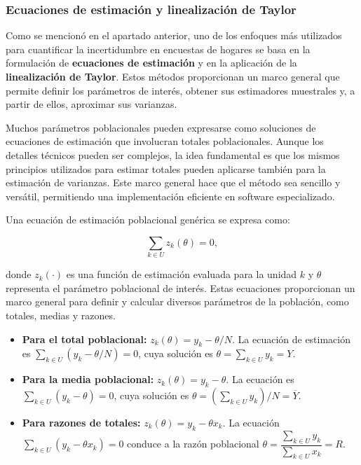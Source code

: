 \documentclass[
  12pt,
]{book}
\begin{document}
\subsubsection*{Ecuaciones de estimación y linealización de Taylor}\label{ecuaciones-de-estimaciuxf3n-y-linealizaciuxf3n-de-taylor}

Como se mencionó en el apartado anterior, uno de los enfoques más utilizados para cuantificar la incertidumbre en encuestas de hogares se basa en la formulación de \textbf{ecuaciones de estimación} y en la aplicación de la \textbf{linealización de Taylor}. Estos métodos proporcionan un marco general que permite definir los parámetros de interés, obtener sus estimadores muestrales y, a partir de ellos, aproximar sus varianzas.

Muchos parámetros poblacionales pueden expresarse como soluciones de ecuaciones de estimación que involucran totales poblacionales. Aunque los detalles técnicos pueden ser complejos, la idea fundamental es que los mismos principios utilizados para estimar totales pueden aplicarse también para la estimación de varianzas. Este marco general hace que el método sea sencillo y versátil, permitiendo una implementación eficiente en software especializado.

Una ecuación de estimación poblacional genérica se expresa como:

\[
\sum_{k\in U} z_k(\theta)=0,
\]

donde \(z_k(\cdot)\) es una función de estimación evaluada para la unidad \(k\) y \(\theta\) representa el parámetro poblacional de interés. Estas ecuaciones proporcionan un marco general para definir y calcular diversos parámetros de la población, como totales, medias y razones.

\begin{itemize}
\item
  \textbf{Para el total poblacional:}
  \(z_k(\theta)=y_k-\theta/N\). La ecuación de estimación es \(\sum_{k\in U}(y_k-\theta/N)=0\), cuya solución es \(\theta=\sum_{k\in U} y_k = Y\).
\item
  \textbf{Para la media poblacional:}
  \(z_k(\theta)=y_k-\theta\). La ecuación es \(\sum_{k\in U}(y_k-\theta)=0\), cuya solución es \(\theta=\left(\sum_{k\in U} y_k\right)/N = \overline{Y}\).
\item
  \textbf{Para razones de totales:}
  \(z_k(\theta)=y_k-\theta x_k\). La ecuación \(\sum_{k\in U}(y_k-\theta x_k)=0\) conduce a la razón poblacional \(\theta=\dfrac{\sum_{k\in U} y_k}{\sum_{k\in U} x_k} = R\).
\end{itemize}
\end{document}
